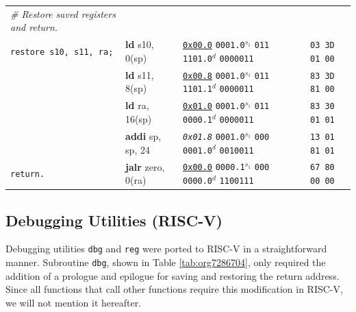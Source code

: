 \documentclass[a4paper,12pt,final]{article}
\begin{document}
\begin{table}[!htbp]
\begin{adjustwidth}{-1cm}{-1cm}
\begin{center}
\begin{tabular}{l|ll|l|l}
\hspace{1em} \emph{\# Restore saved registers and return.} &  &  &  & \\[0pt]
\hspace{1em} \texttt{restore s10, s11, ra;} & \textbf{ld} s10, 0(sp) & \uline{\texttt{0x00.0}}                    \texttt{0001.0}​\(^{s_{1}}\) \texttt{011} \texttt{1101.0}​\(^{d}\)  \texttt{0000011} &  & \texttt{03 3D 01 00}\\[0pt]
 & \textbf{ld} s11, 8(sp) & \uline{\texttt{0x00.8}}                    \texttt{0001.0}​\(^{s_{1}}\) \texttt{011} \texttt{1101.1}​\(^{d}\)  \texttt{0000011} &  & \texttt{83 3D 81 00}\\[0pt]
 & \textbf{ld} ra, 16(sp) & \uline{\texttt{0x01.0}}                    \texttt{0001.0}​\(^{s_{1}}\) \texttt{011} \texttt{0000.1}​\(^{d}\)  \texttt{0000011} &  & \texttt{83 30 01 01}\\[0pt]
 & \textbf{addi} sp, sp, 24 & \emph{\texttt{0x01.8}}                    \texttt{0001.0}​\(^{s_{1}}\) \texttt{000} \texttt{0001.0}​\(^{d}\)  \texttt{0010011} &  & \texttt{13 01 81 01}\\[0pt]
\hspace{1em} \texttt{return.} & \textbf{jalr} zero, 0(ra) & \uline{\texttt{0x00.0}}                    \texttt{0000.1}​\(^{s_{1}}\) \texttt{000} \texttt{0000.0}​\(^{d}\)  \texttt{1100111} &  & \texttt{67 80 00 00}\\[0pt]
\end{tabular}

\end{center}
\normalsize \end{adjustwidth} \end{table} \vspace{0}
\clearpage


\subsection{Debugging Utilities (RISC-V)}
\label{sec:org59e06af}

Debugging utilities \texttt{dbg} and \texttt{reg} were ported to RISC-V in a
straightforward manner.  Subroutine \texttt{dbg}, shown in Table
\ref{tab:org7286704}, only required the addition of a prologue and
epilogue for saving and restoring the return address.  Since all
functions that call other functions require this modification in
RISC-V, we will not mention it hereafter.
\end{document}

